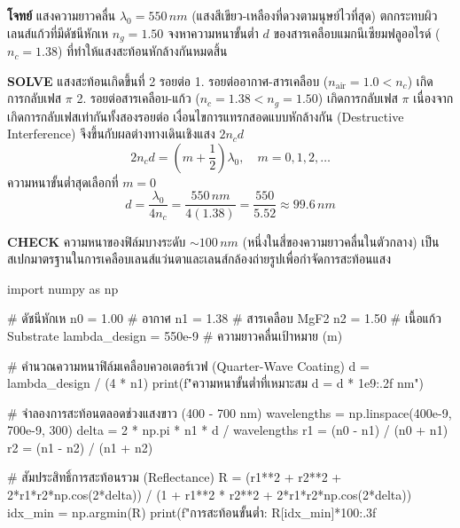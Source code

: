 \begin{mathexample}
\textbf{โจทย์} แสงความยาวคลื่น $\lambda_0 = 550\,\si{nm}$ (แสงสีเขียว-เหลืองที่ดวงตามนุษย์ไวที่สุด) ตกกระทบผิวเลนส์แก้วที่มีดัชนีหักเห $n_g = 1.50$ จงหาความหนาขั้นต่ำ $d$ ของสารเคลือบแมกนีเซียมฟลูออไรด์ ($n_c = 1.38$) ที่ทำให้แสงสะท้อนหักล้างกันหมดสิ้น

\vspace{0.2cm}
\textbf{SOLVE} แสงสะท้อนเกิดขึ้นที่ 2 รอยต่อ
1. รอยต่ออากาศ-สารเคลือบ ($n_{\text{air}} = 1.0 < n_c$) เกิดการกลับเฟส $\pi$
2. รอยต่อสารเคลือบ-แก้ว ($n_c = 1.38 < n_g = 1.50$) เกิดการกลับเฟส $\pi$
เนื่องจากเกิดการกลับเฟสเท่ากันทั้งสองรอยต่อ เงื่อนไขการแทรกสอดแบบหักล้างกัน (Destructive Interference) จึงขึ้นกับผลต่างทางเดินเชิงแสง $2 n_c d$
\begin{equation}
2 n_c d = \left(m + \frac{1}{2}\right)\lambda_0, \quad m = 0, 1, 2, \dots
\end{equation}
ความหนาขั้นต่ำสุดเลือกที่ $m = 0$
\begin{equation}
d = \frac{\lambda_0}{4 n_c} = \frac{550\,\si{nm}}{4(1.38)} = \frac{550}{5.52} \approx 99.6\,\si{nm}
\end{equation}

\vspace{0.2cm}
\textbf{CHECK} ความหนาของฟิล์มบางระดับ $\sim 100\,\si{nm}$ (หนึ่งในสี่ของความยาวคลื่นในตัวกลาง) เป็นสเปกมาตรฐานในการเคลือบเลนส์แว่นตาและเลนส์กล้องถ่ายรูปเพื่อกำจัดการสะท้อนแสง\qedexam

\begin{pythonbox}
import numpy as np

# ดัชนีหักเห
n0 = 1.00  # อากาศ
n1 = 1.38  # สารเคลือบ MgF2
n2 = 1.50  # เนื้อแก้ว Substrate
lambda_design = 550e-9  # ความยาวคลื่นเป้าหมาย (m)

# คำนวณความหนาฟิล์มเคลือบควอเตอร์เวฟ (Quarter-Wave Coating)
d = lambda_design / (4 * n1)
print(f"ความหนาขั้นต่ำที่เหมาะสม d = {d * 1e9:.2f} nm")

# จำลองการสะท้อนตลอดช่วงแสงขาว (400 - 700 nm)
wavelengths = np.linspace(400e-9, 700e-9, 300)
delta = 2 * np.pi * n1 * d / wavelengths
r1 = (n0 - n1) / (n0 + n1)
r2 = (n1 - n2) / (n1 + n2)

# สัมประสิทธิ์การสะท้อนรวม (Reflectance)
R = (r1**2 + r2**2 + 2*r1*r2*np.cos(2*delta)) / (1 + r1**2 * r2**2 + 2*r1*r2*np.cos(2*delta))
idx_min = np.argmin(R)
print(f"การสะท้อนขั้นต่ำ: {R[idx_min]*100:.3f}%
\end{pythonbox}
\end{mathexample}

